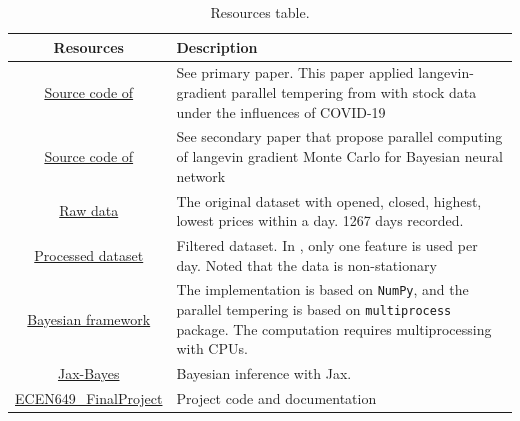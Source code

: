 \documentclass{article}
\begin{document}
\begin{table}[h]
    \centering
    \begin{tabularx}{\textwidth}{cX}
       \textbf{Resources} & \textbf{Description} \\
       \hline
       \href{https://github.com/sydney-machine-learning/Bayesianneuralnet_stockmarket}{Source code  of \cite{chandra2021bayesian}} & See primary paper\cite{chandra2021bayesian}. This paper applied langevin-gradient parallel tempering from \cite{chandra2019langevin} with stock data under the influences of COVID-19\\\hline
       \href{https://github.com/sydney-machine-learning/parallel-tempering-neural-net}{Source code of \cite{chandra2019langevin}} & See secondary paper\cite{chandra2019langevin} that propose parallel computing of langevin gradient Monte Carlo for Bayesian neural network\\\hline
        \href{https://github.com/sydney-machine-learning/Bayesianneuralnet_stockmarket/blob/master/code/datasets/raw/DAI.DE.csv}{Raw data}  & The original dataset with opened, closed, highest, lowest prices within a day. 1267 days recorded.  \\\hline
       \href{https://github.com/sydney-machine-learning/Bayesianneuralnet_stockmarket/blob/master/code/datasets/600118.SS_1_train.txt}{Processed dataset}  & Filtered dataset. In \cite{chandra2021bayesian}, only one feature is used per day. Noted that the data is non-stationary  \\\hline
       \href{https://github.com/sydney-machine-learning/Bayesianneuralnet_stockmarket/blob/6d24cf25115b6517e3099249bc657674f6b9b98f/code/pt_timeseries_regression.py\#L36-L142}{Bayesian framework} & The implementation is based on \texttt{NumPy}, and the parallel tempering is based on \texttt{multiprocess} package. The computation requires multiprocessing with CPUs.\\
       \href{https://github.com/jamesvuc/jax-bayes}{Jax-Bayes} & Bayesian inference with Jax\cite{jax2018github}.\\\hline
       \href{https://github.com/stevengogogo/ECEN649_FinalProject}{ECEN649\_FinalProject} & Project code and documentation
    \end{tabularx}
    \caption{Resources table.}
    \label{tab:my_label}
\end{table}
\end{document}
